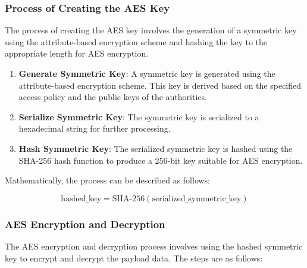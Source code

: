 \documentclass[cic,tc,english]{iiufrgs}
\begin{document}
            \subsubsection{Process of Creating the AES Key}

                The process of creating the AES key involves the generation of a symmetric key using the attribute-based encryption scheme and hashing the key to the appropriate length for AES encryption.

                \begin{enumerate}
                    \item \textbf{Generate Symmetric Key}: A symmetric key is generated using the attribute-based encryption scheme. This key is derived based on the specified access policy and the public keys of the authorities.
                    \item \textbf{Serialize Symmetric Key}: The symmetric key is serialized to a hexadecimal string for further processing.
                    \item \textbf{Hash Symmetric Key}: The serialized symmetric key is hashed using the SHA-256 hash function to produce a 256-bit key suitable for AES encryption.
                \end{enumerate}

                Mathematically, the process can be described as follows:

                \begin{equation}
                \text{hashed\_key} = \text{SHA-256}(\text{serialized\_symmetric\_key})
                \end{equation}
            \subsubsection{AES Encryption and Decryption}

                The AES encryption and decryption process involves using the hashed symmetric key to encrypt and decrypt the payload data. The steps are as follows:
\end{document}
